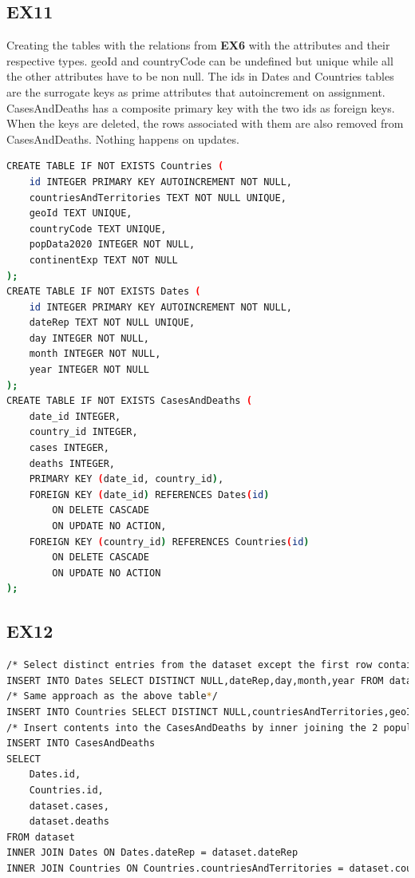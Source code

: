 \documentclass[12pt,oneside,a4paper,english]{article}
\begin{document}
\subsection{EX11}
\noindent Creating the tables with the relations from \textbf{EX6} with the attributes and their respective types. geoId and countryCode can be undefined but unique while all the other attributes have to be non null. The ids in Dates and Countries tables are the surrogate keys as prime attributes that autoincrement on assignment. CasesAndDeaths has a composite primary key with the two ids as foreign keys. When the keys are deleted, the rows associated with them are also removed from CasesAndDeaths. Nothing happens on updates.
\begin{lstlisting}[language=Bash]
CREATE TABLE IF NOT EXISTS Countries (
	id INTEGER PRIMARY KEY AUTOINCREMENT NOT NULL,
	countriesAndTerritories TEXT NOT NULL UNIQUE,
	geoId TEXT UNIQUE,
	countryCode TEXT UNIQUE,
	popData2020 INTEGER NOT NULL,
	continentExp TEXT NOT NULL
);
CREATE TABLE IF NOT EXISTS Dates (
	id INTEGER PRIMARY KEY AUTOINCREMENT NOT NULL,
	dateRep TEXT NOT NULL UNIQUE,
	day INTEGER NOT NULL,
	month INTEGER NOT NULL,
	year INTEGER NOT NULL
);
CREATE TABLE IF NOT EXISTS CasesAndDeaths (
	date_id INTEGER,
	country_id INTEGER,
	cases INTEGER,
	deaths INTEGER,
	PRIMARY KEY (date_id, country_id),
	FOREIGN KEY (date_id) REFERENCES Dates(id)
		ON DELETE CASCADE
		ON UPDATE NO ACTION,
	FOREIGN KEY (country_id) REFERENCES Countries(id)
		ON DELETE CASCADE
		ON UPDATE NO ACTION
);
\end{lstlisting}

\subsection{EX12}
\begin{lstlisting}[language=Bash]
/* Select distinct entries from the dataset except the first row containing the head. Provide NULL as the surrogate key. */
INSERT INTO Dates SELECT DISTINCT NULL,dateRep,day,month,year FROM dataset LIMIT -1 OFFSET 1;
/* Same approach as the above table*/
INSERT INTO Countries SELECT DISTINCT NULL,countriesAndTerritories,geoId,countryterritoryCode,popData2020,continentExp FROM dataset LIMIT -1 OFFSET 1;
/* Insert contents into the CasesAndDeaths by inner joining the 2 populated tables above with the dataset and selecting the ids, cases and deaths.*/
INSERT INTO CasesAndDeaths
SELECT
	Dates.id,
	Countries.id,
	dataset.cases,
	dataset.deaths
FROM dataset 
INNER JOIN Dates ON Dates.dateRep = dataset.dateRep 
INNER JOIN Countries ON Countries.countriesAndTerritories = dataset.countriesAndTerritories;
\end{lstlisting}
\end{document}

